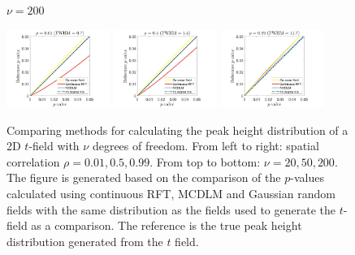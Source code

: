 \documentclass{article}
\begin{document}
\begin{figure}[!htp]
\begin{sideways}
\phantom{------------------}$\nu = 200$
\end{sideways}
\includegraphics[trim=70 5 100 5, clip,width=0.3\textwidth]{figure/2D_nu200_rho0.01.jpg}
\includegraphics[trim=70 5 100 5, clip,width=0.3\textwidth]{figure/2D_nu200_rho0.5.jpg}
\includegraphics[trim=70 5 100 5, clip,width=0.3\textwidth]{figure/2D_nu200_rho0.99.jpg}
\caption{Comparing methods for calculating the peak height distribution of a 2D $t$-field with $\nu$ degrees of freedom. From left to right: spatial correlation $\rho = 0.01, 0.5, 0.99$. From top to bottom: $\nu = 20, 50, 200$. The figure is generated based on the comparison of the $p$-values calculated using continuous RFT, MCDLM and Gaussian random fields with the same distribution as the fields used to generate the $t$-field as a comparison. The reference is the true peak height distribution generated from the $t$ field.\label{fig11}}
\end{figure}
\end{document}
